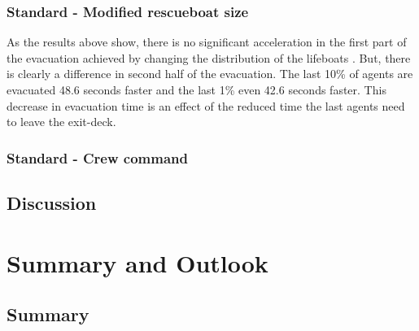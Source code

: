 \documentclass[11pt]{article}
\begin{document}
\subsubsection{Standard - Modified rescueboat size}

As the results above show, there is no significant acceleration in the first part of the evacuation achieved by changing the distribution of the lifeboats .  
 But, there is clearly a difference in second half of the evacuation. The last 10\% of agents are evacuated 48.6 seconds faster and the last 1\% even 42.6 seconds faster. 
This decrease in evacuation time is an effect of the reduced time the last agents need to leave the exit-deck.


\subsubsection{Standard - Crew command}
\subsection{Discussion}
\section{Summary and Outlook}
\subsection{Summary}
\end{document}
